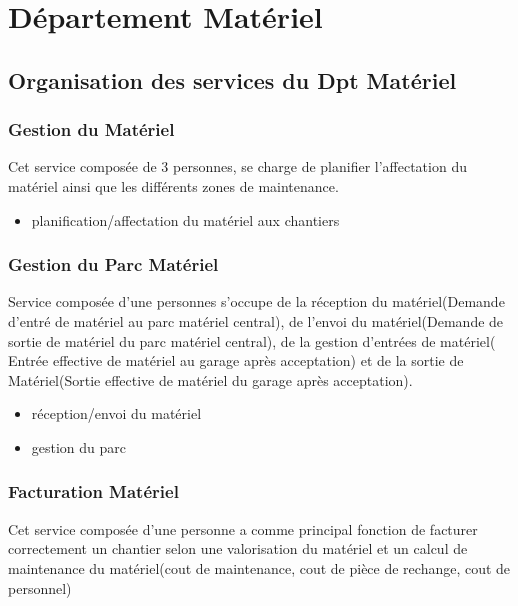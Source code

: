 \documentclass [a4paper] {report}
\begin{document}
\section{Département Matériel}
\subsection{Organisation des services du Dpt Matériel}


	\subsubsection{Gestion du Matériel}

	Cet service composée de 3 personnes, se charge de planifier l'affectation du matériel ainsi que les différents zones de maintenance.\\
	
	\begin{itemize}
		\item	planification/affectation du matériel aux chantiers\\
	\end{itemize}
	
	\subsubsection{Gestion du Parc Matériel}
	Service composée d'une personnes s'occupe de la réception du matériel(Demande d'entré de matériel au parc matériel central), de l'envoi du matériel(Demande de sortie de matériel du parc matériel central), de la gestion d'entrées de matériel( Entrée effective de matériel au garage après acceptation) et de la sortie de Matériel(Sortie effective de matériel du garage après acceptation).\\
	
	\begin{itemize}
		\item réception/envoi du matériel\\
		\item gestion du parc\\
	\end{itemize}
	
	\subsubsection{Facturation Matériel}
	Cet service composée d'une personne a comme principal fonction de facturer correctement un chantier selon une valorisation du matériel et un calcul de maintenance du matériel(cout de maintenance, cout de pièce de rechange, cout de personnel)\\
	
\end{document}
